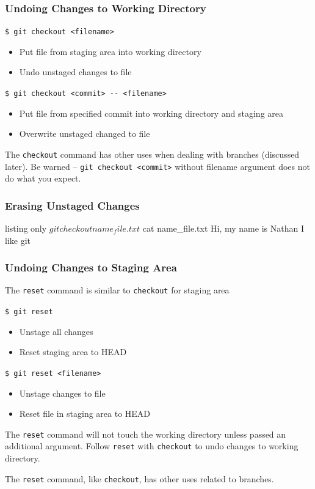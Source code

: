 \documentclass[english,compress]{beamer}
\begin{document}
\begin{frame}[fragile]
    \frametitle{Undoing Changes to Working Directory}

    \verb|$ git checkout <filename>|
    \begin{itemize}
        \item Put file from staging area into working directory
        \item Undo unstaged changes to file
    \end{itemize}
    \verb|$ git checkout <commit> -- <filename>|
    \begin{itemize}
        \item Put file from specified commit into working directory and
              staging area
        \item Overwrite unstaged changed to file
    \end{itemize}

    The \verb|checkout| command has other uses when dealing with branches
    (discussed later). Be warned -- \verb|git checkout <commit>| without
    filename argument does not do what you expect.
\end{frame}

\begin{frame}[fragile]
    \frametitle{Erasing Unstaged Changes}
    \begin{tcblisting}{listing only}
$ git checkout name_file.txt
$ cat name_file.txt 
Hi, my name is Nathan
I like git
    \end{tcblisting}
\end{frame}

\begin{frame}[fragile]
    \frametitle{Undoing Changes to Staging Area}

    The \verb|reset| command is similar to \verb|checkout| for staging area

    \verb|$ git reset|
    \begin{itemize}
        \item Unstage all changes
        \item Reset staging area to HEAD
    \end{itemize}
    \verb|$ git reset <filename>|
    \begin{itemize}
        \item Unstage changes to file
        \item Reset file in staging area to HEAD
    \end{itemize}

    The \verb|reset| command will not touch the working directory unless
    passed an additional argument. Follow \verb|reset| with \verb|checkout|
    to undo changes to working directory.

    The \verb|reset| command, like \verb|checkout|, has other uses related
    to branches.
\end{frame}
\end{document}
